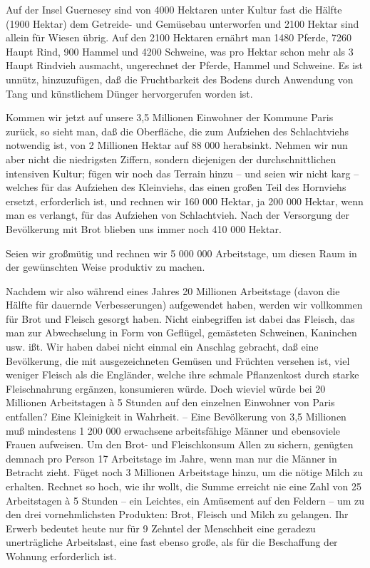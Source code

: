 \documentclass{scrbook}
\begin{document}
Auf der Insel Guernesey sind von 4000 Hektaren unter Kultur fast die Hälfte (1900 Hektar) dem Getreide- und Gemüsebau unterworfen und 2100 Hektar sind allein für Wiesen übrig. Auf den 2100 Hektaren ernährt man 1480 Pferde, 7260 Haupt Rind, 900 Hammel und 4200 Schweine, was pro Hektar schon mehr als 3 Haupt Rindvieh ausmacht, ungerechnet der Pferde, Hammel und Schweine. Es ist unnütz, hinzuzufügen, daß die Fruchtbarkeit des Bodens durch Anwendung von Tang und künstlichem Dünger hervorgerufen worden ist.

Kommen wir jetzt auf unsere 3,5 Millionen Einwohner der Kommune Paris zurück, so sieht man, daß die Oberfläche, die zum Aufziehen des Schlachtviehs notwendig ist, von 2 Millionen Hektar auf 88 000 herabsinkt. Nehmen wir nun aber nicht die niedrigsten Ziffern, sondern diejenigen der durchschnittlichen intensiven Kultur; fügen wir noch das Terrain hinzu – und seien wir nicht karg – welches für das Aufziehen des Kleinviehs, das einen großen Teil des Hornviehs ersetzt, erforderlich ist, und rechnen wir 160 000 Hektar, ja 200 000 Hektar, wenn man es verlangt, für das Aufziehen von Schlachtvieh. Nach der Versorgung der Bevölkerung mit Brot blieben uns immer noch 410 000 Hektar.

Seien wir großmütig und rechnen wir 5 000 000 Arbeitstage, um diesen Raum in der gewünschten Weise produktiv zu machen.

Nachdem wir also während eines Jahres 20 Millionen Arbeitstage (davon die Hälfte für dauernde Verbesserungen) aufgewendet haben, werden wir vollkommen für Brot und Fleisch gesorgt haben. Nicht einbegriffen ist dabei das Fleisch, das man zur Abwechselung in Form von Geflügel, gemästeten Schweinen, Kaninchen usw. ißt. Wir haben dabei nicht einmal ein Anschlag gebracht, daß eine Bevölkerung, die mit ausgezeichneten Gemüsen und Früchten versehen ist, viel weniger Fleisch als die Engländer, welche ihre schmale Pflanzenkost durch starke Fleischnahrung ergänzen, konsumieren würde. Doch wieviel würde bei 20 Millionen Arbeitstagen à 5 Stunden auf den einzelnen Einwohner von Paris entfallen? Eine Kleinigkeit in Wahrheit. – Eine Bevölkerung von 3,5 Millionen muß mindestens 1 200 000 erwachsene arbeitsfähige Männer und ebensoviele Frauen aufweisen. Um den Brot- und Fleischkonsum Allen zu sichern, genügten demnach pro Person 17 Arbeitstage im Jahre, wenn man nur die Männer in Betracht zieht. Füget noch 3 Millionen Arbeitstage hinzu, um die nötige Milch zu erhalten. Rechnet so hoch, wie ihr wollt, die Summe erreicht nie eine Zahl von 25 Arbeitstagen à 5 Stunden – ein Leichtes, ein Amüsement auf den Feldern – um zu den drei vornehmlichsten Produkten: Brot, Fleisch und Milch zu gelangen. Ihr Erwerb bedeutet heute nur für 9 Zehntel der Menschheit eine geradezu unerträgliche Arbeitslast, eine fast ebenso große, als für die Beschaffung der Wohnung erforderlich ist.
\end{document}

